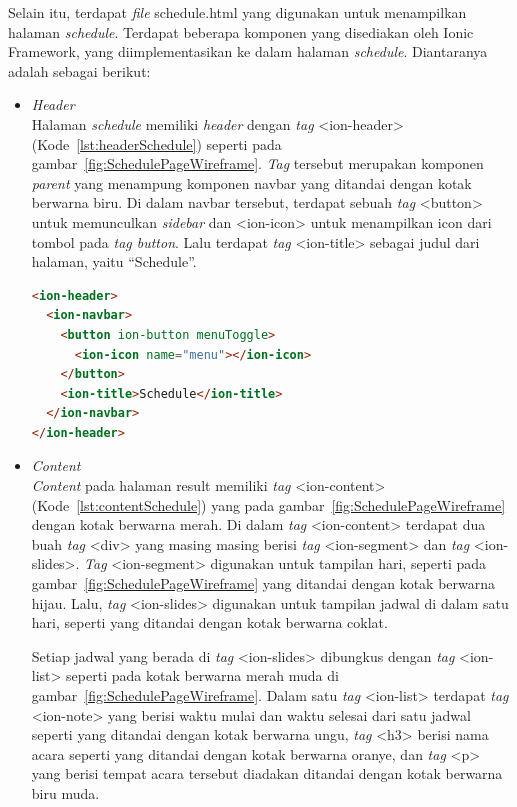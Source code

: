 \begin{itemize}
	Selain itu, terdapat \textit{file} schedule.html yang digunakan untuk menampilkan halaman \textit{schedule}. Terdapat beberapa komponen yang disediakan oleh Ionic Framework, yang diimplementasikan ke dalam halaman \textit{schedule}. Diantaranya adalah sebagai berikut:
	
	\begin{itemize}
		\item \textit{Header} \\
		Halaman \textit{schedule} memiliki \textit{header} dengan \textit{tag} <ion-header> (Kode~\ref{lst:headerSchedule}) seperti pada gambar~\ref{fig:SchedulePageWireframe}. \textit{Tag} tersebut merupakan komponen \textit{parent} yang menampung komponen navbar yang ditandai dengan kotak berwarna biru. Di dalam navbar tersebut, terdapat sebuah \textit{tag} <button> untuk memunculkan \textit{sidebar} dan <ion-icon> untuk menampilkan icon dari tombol pada \textit{tag button}. Lalu terdapat \textit{tag} <ion-title> sebagai judul dari halaman, yaitu ``Schedule''.
		
\begin{lstlisting}[language=html, label={lst:headerSchedule}, caption=\textit{Header} pada schedule.html]
<ion-header>
  <ion-navbar>
    <button ion-button menuToggle>
      <ion-icon name="menu"></ion-icon>
    </button>
    <ion-title>Schedule</ion-title>
  </ion-navbar>
</ion-header>
\end{lstlisting} 

\newpage

		\item \textit{Content} \\
		\textit{Content} pada halaman result memiliki \textit{tag} <ion-content> (Kode~\ref{lst:contentSchedule}) yang pada gambar~\ref{fig:SchedulePageWireframe} dengan kotak berwarna merah. Di dalam \textit{tag} <ion-content> terdapat dua buah \textit{tag} <div> yang masing masing berisi \textit{tag} <ion-segment> dan \textit{tag} <ion-slides>. \textit{Tag} <ion-segment> digunakan untuk tampilan hari, seperti pada gambar~\ref{fig:SchedulePageWireframe} yang ditandai dengan kotak berwarna hijau. Lalu, \textit{tag} <ion-slides> digunakan untuk tampilan jadwal di dalam satu hari, seperti yang ditandai dengan kotak berwarna coklat. 
		
		Setiap jadwal yang berada di \textit{tag} <ion-slides> dibungkus dengan \textit{tag} <ion-list> seperti pada kotak berwarna merah muda di gambar~\ref{fig:SchedulePageWireframe}. Dalam satu \textit{tag} <ion-list> terdapat \textit{tag} <ion-note> yang berisi waktu mulai dan waktu selesai dari satu jadwal seperti yang ditandai dengan kotak berwarna ungu, \textit{tag} <h3> berisi nama acara seperti yang ditandai dengan kotak berwarna oranye, dan \textit{tag} <p> yang berisi tempat acara tersebut diadakan ditandai dengan kotak berwarna biru muda.
		

\end{itemize}
\end{itemize}
